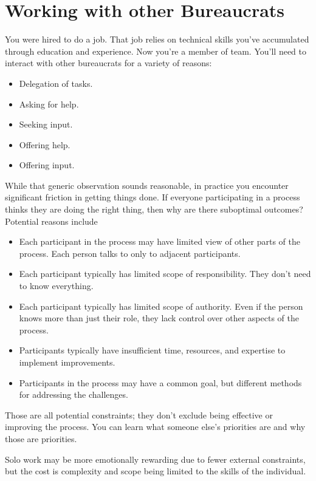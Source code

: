 \chapter{Working with other Bureaucrats\label{sec:working-with-other-bureaucrats}}

You were hired to do a job. That job relies on technical skills you've accumulated through education and experience. Now you're a member of team. You'll need to interact with other bureaucrats for a variety of reasons:
\begin{itemize}
    \item Delegation of tasks.
    \item Asking for help.
    \item Seeking input.
    \item Offering help.
    \item Offering input.
\end{itemize}
While that generic observation sounds reasonable, in practice you encounter significant friction in getting things done. 
If everyone participating in a process thinks they are doing the right thing, then why are there suboptimal outcomes? Potential reasons include
\begin{itemize}
    \item Each participant in the process may have limited view of other parts of the process. Each person talks to only to adjacent participants.
    \item Each participant typically has limited scope of responsibility. They don't need to know everything. 
    \item Each participant typically has limited scope of authority. Even if the person knows more than just their role, they lack control over other aspects of the process.
    \item Participants typically have insufficient time, resources, and expertise to implement improvements.
    \item Participants in the process may have a common goal, but different methods for addressing the challenges.
\end{itemize}
Those are all potential constraints; they don't exclude being effective or improving the process. 
You can learn what someone else's priorities are and why those are priorities.

Solo work may be more emotionally rewarding due to fewer external constraints, but the cost is complexity and scope being limited to the skills of the individual. 


